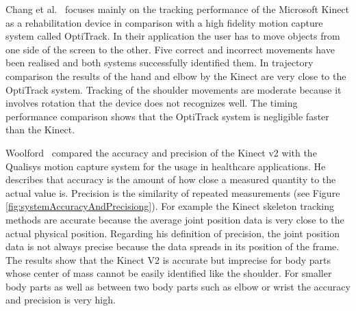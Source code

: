 Chang et al.~\cite{Chang2012-hz} focuses mainly on the tracking performance of the Microsoft Kinect as a rehabilitation device in comparison with a high fidelity motion capture system called OptiTrack. In their application the user has to move objects from one side of the screen to the other. Five correct and incorrect movements have been realised and both systems successfully identified them. In trajectory comparison the results of the hand and elbow by the Kinect are very close to the OptiTrack system. Tracking of the shoulder movements are moderate because it involves rotation that the device does not recognizes well. The timing performance comparison shows that the OptiTrack system is negligible faster than the Kinect.

Woolford~\cite{Woolford2015-ub} compared the accuracy and precision of the Kinect v2 with the Qualisys motion capture system for the usage in healthcare applications. He describes that accuracy is the amount of how close a measured quantity to the actual value is. Precision is the similarity of repeated measurements (see Figure \ref{fig:systemAccuracyAndPrecisiong}). For example the Kinect skeleton tracking methods are accurate because the average joint position data is very close to the actual physical position. Regarding his definition of precision, the joint position data is not always precise because the data spreads in its position of the frame. The results show that the Kinect V2 is accurate but imprecise for body parts whose center of mass cannot be easily identified like the shoulder. For smaller body parts as well as between two body parts such as elbow or wrist the accuracy and precision is very high. 

